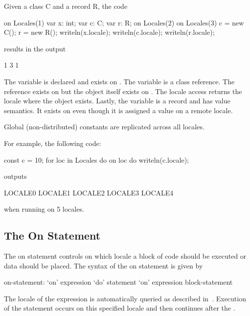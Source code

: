 \begin{example}
Given a class C and a record R, the code
\begin{chapel}
on Locales(1) {
  var x: int;
  var c: C;
  var r: R;
  on Locales(2) {
    on Locales(3) {
      c = new C();
      r = new R();
    }
    writeln(x.locale);
    writeln(c.locale);
    writeln(r.locale);
  }
}
\end{chapel}
results in the output
\begin{chapel}
1
3
1
\end{chapel}
The variable  is declared and exists on .
The variable  is a class reference.  The reference exists
on  but the object itself exists
on .  The locale access returns the locale where the
object exists.  Lastly, the variable  is a record and has
value semantics.  It exists on  even though it is
assigned a value on a remote locale.
\end{example}

Global (non-distributed) constants are replicated across all locales.
\begin{example}
For example, the following code:
%
%
\begin{chapel}
const c = 10;
for loc in Locales do on loc do
    writeln(c.locale);
\end{chapel}
outputs
\begin{chapel}
LOCALE0
LOCALE1
LOCALE2
LOCALE3
LOCALE4
\end{chapel}
when running on 5 locales.
\end{example}


\subsection{The On Statement}
\label{On}

The on statement controls on which locale a block of code should be
executed or data should be placed.  The syntax of the on statement is
given by
\begin{syntax}
on-statement:
  `on' expression `do' statement
  `on' expression block-statement
\end{syntax}
The locale of the expression is automatically queried as described
in~.  Execution of the
statement occurs on this specified locale and then continues after
the .

